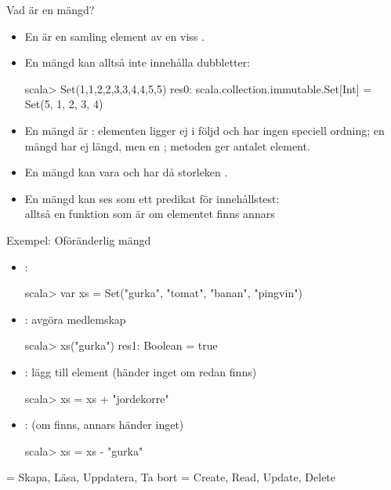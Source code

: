 

\begin{Slide}{Vad är en mängd?}
\begin{itemize}
\item En  är en samling  element av en viss .
\item En mängd kan alltså inte innehålla dubbletter:
\begin{REPLnonum}
scala> Set(1,1,2,2,3,3,4,4,5,5)
res0: scala.collection.immutable.Set[Int] =
  Set(5, 1, 2, 3, 4)
\end{REPLnonum}
\item En mängd är : elementen ligger ej i följd och har ingen speciell ordning; en mängd har ej längd, men en ; metoden  ger antalet element.
\item En mängd kan vara  och har då storleken .
\pause
\item En mängd kan ses som ett predikat för innehållstest:\\alltså en funktion  som är  om elementet finns annars 
\end{itemize}
\end{Slide}


\begin{Slide}{Exempel: Oföränderlig mängd}
\setlength{\leftmargini}{1em}
\begin{itemize}
\item {}:
\begin{REPLnonum}
scala> var xs = Set("gurka", "tomat", "banan", "pingvin")
\end{REPLnonum}

\item {}: avgöra medlemskap
\begin{REPLnonum}
scala> xs("gurka")
res1: Boolean = true
\end{REPLnonum}

\item {}: lägg till element (händer inget om redan finns)
\begin{REPLnonum}
scala> xs = xs + "jordekorre"
\end{REPLnonum}

\item {}: (om finns, annars händer inget)
\begin{REPLnonum}
scala> xs = xs - "gurka"
\end{REPLnonum}
\end{itemize}
{\SlideFontTiny{} = Skapa, Läsa, Uppdatera, Ta bort \hfill{} = Create, Read, Update, Delete}
\end{Slide}







